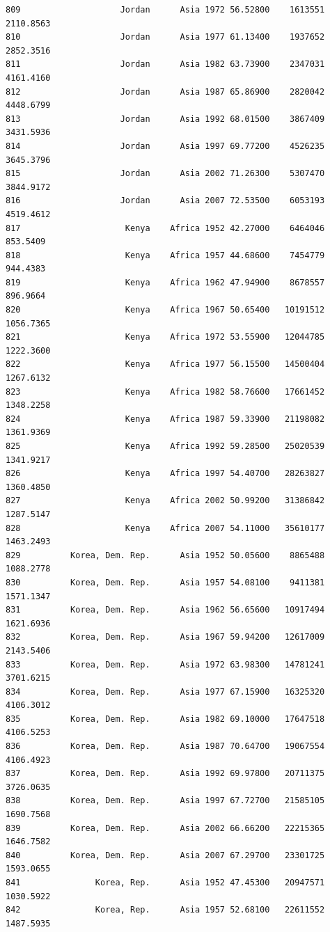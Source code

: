 \documentclass[
  letterpaper,
  DIV=11,
  numbers=noendperiod]{scrreprt}
\begin{document}
\begin{verbatim}
809                    Jordan      Asia 1972 56.52800    1613551   2110.8563
810                    Jordan      Asia 1977 61.13400    1937652   2852.3516
811                    Jordan      Asia 1982 63.73900    2347031   4161.4160
812                    Jordan      Asia 1987 65.86900    2820042   4448.6799
813                    Jordan      Asia 1992 68.01500    3867409   3431.5936
814                    Jordan      Asia 1997 69.77200    4526235   3645.3796
815                    Jordan      Asia 2002 71.26300    5307470   3844.9172
816                    Jordan      Asia 2007 72.53500    6053193   4519.4612
817                     Kenya    Africa 1952 42.27000    6464046    853.5409
818                     Kenya    Africa 1957 44.68600    7454779    944.4383
819                     Kenya    Africa 1962 47.94900    8678557    896.9664
820                     Kenya    Africa 1967 50.65400   10191512   1056.7365
821                     Kenya    Africa 1972 53.55900   12044785   1222.3600
822                     Kenya    Africa 1977 56.15500   14500404   1267.6132
823                     Kenya    Africa 1982 58.76600   17661452   1348.2258
824                     Kenya    Africa 1987 59.33900   21198082   1361.9369
825                     Kenya    Africa 1992 59.28500   25020539   1341.9217
826                     Kenya    Africa 1997 54.40700   28263827   1360.4850
827                     Kenya    Africa 2002 50.99200   31386842   1287.5147
828                     Kenya    Africa 2007 54.11000   35610177   1463.2493
829          Korea, Dem. Rep.      Asia 1952 50.05600    8865488   1088.2778
830          Korea, Dem. Rep.      Asia 1957 54.08100    9411381   1571.1347
831          Korea, Dem. Rep.      Asia 1962 56.65600   10917494   1621.6936
832          Korea, Dem. Rep.      Asia 1967 59.94200   12617009   2143.5406
833          Korea, Dem. Rep.      Asia 1972 63.98300   14781241   3701.6215
834          Korea, Dem. Rep.      Asia 1977 67.15900   16325320   4106.3012
835          Korea, Dem. Rep.      Asia 1982 69.10000   17647518   4106.5253
836          Korea, Dem. Rep.      Asia 1987 70.64700   19067554   4106.4923
837          Korea, Dem. Rep.      Asia 1992 69.97800   20711375   3726.0635
838          Korea, Dem. Rep.      Asia 1997 67.72700   21585105   1690.7568
839          Korea, Dem. Rep.      Asia 2002 66.66200   22215365   1646.7582
840          Korea, Dem. Rep.      Asia 2007 67.29700   23301725   1593.0655
841               Korea, Rep.      Asia 1952 47.45300   20947571   1030.5922
842               Korea, Rep.      Asia 1957 52.68100   22611552   1487.5935

\end{verbatim}
\end{document}
